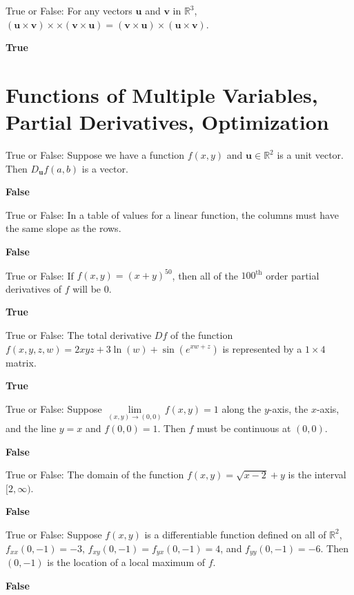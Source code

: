 \documentclass{exam}
\newcommand{\R}{\mathbb{R}}
\newcommand{\bu}{\mathbf{u}}
\newcommand{\bv}{\mathbf{v}}
\begin{document}
\begin{questions}
		\question True or False: For any vectors $\bu$ and $\bv$ in $\R^3$, $(\bu \times \bv) ×\times (\bv \times \bu) = (\bv \times \bu) \times (\bu \times \bv)$.
		 \begin{solution}
		 	\textbf{True}
		 \end{solution}
		  
	
		\section{Functions of Multiple Variables, Partial Derivatives, Optimization}
		\question True or False:  Suppose we have a function $f(x,y)$ and $\bu\in \R^2$ is a unit vector. Then $D_{\bu}f(a,b)$ is a vector.
		 \begin{solution}
		 	\textbf{False}
		 \end{solution}
	 
 		\question True or False: In a table of values for a linear function, the columns must have the same slope as the rows.
		\begin{solution}
			\textbf{False}
		\end{solution}

		\question True or False:  If $f(x,y)=(x+y)^{50}$, then all of the $100^{\text{th}}$ order partial derivatives of $f$ will be 0.  
		 \begin{solution}
		 	\textbf{True}
		 \end{solution}

		\question True or False:  The total derivative $Df$ of the function $f(x,y,z,w)=2xyz+3\ln(w)+\sin(e^{xw+z})$ is represented by a $1\times 4$ matrix.
		 \begin{solution}
		 	\textbf{True}
		 \end{solution}

		\question True or False:  Suppose $\lim\limits_{(x,y)\to(0,0)} f(x,y)=1$ along the $y$-axis, the $x$-axis, and the line $y=x$ and $f(0,0)=1$. Then $f$ must be continuous at $(0,0)$.
		 \begin{solution}
		 	\textbf{False}
		 \end{solution}

		\question True or False:  The domain of the function $f(x,y)=\sqrt{x-2}+y$ is the interval $[2,\infty)$. 
		 \begin{solution}
		 	\textbf{False}
		 \end{solution}
		
		\question True or False:   Suppose $f(x,y)$ is a differentiable function defined on all of $\R^2$, $f_{xx}(0,-1) = -3$, $f_{xy}(0,-1)=f_{yx}(0,-1)=4$, and $f_{yy}(0,-1)=-6$. Then $(0,-1)$ is the location of a local maximum of $f$.
		 \begin{solution}
		 	\textbf{False}
		 \end{solution}
		

\end{questions}
\end{document}
